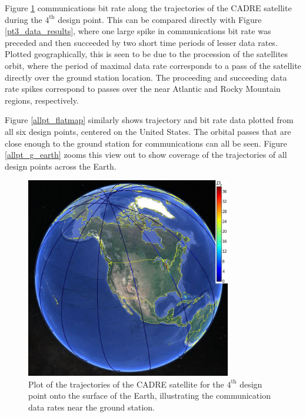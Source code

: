\documentclass[]{aiaa-tc} %
\begin{document}
    Figure \ref{pt3_g_earth} communications bit rate along the trajectories of the
    CADRE satellite during the $4^{\textrm{th}}$ design point. This can be compared
    directly with Figure \ref{pt3_data_results}, where one large spike in communications
    bit rate was preceded and then succeeded by two short time periods of lesser
    data rates. Plotted geographically, this is seen to be due to the procession of
    the satellites orbit, where the period of maximal data rate corresponds to a
    pass of the satellite directly over the ground station location. The proceeding and
    succeeding data rate spikes correspond to passes over the near Atlantic and
    Rocky Mountain regions, respectively.


    Figure \ref{allpt_flatmap} similarly shows trajectory and bit rate data plotted
    from all six design points, centered on the United States. The orbital passes
    that are close enough to the ground station for communications can all be seen.
    Figure \ref{allpt_g_earth} zooms this view out to show coverage of the trajectories
    of all design points across the Earth.


    \begin{figure}
    \centering
    \includegraphics[width=0.8\textwidth]{images/pt3_gearth3.png}
    \caption[width=0.4\textwidth]{Plot of the trajectories of the CADRE satellite
    for the $4^{\textrm{th}}$ design point onto the surface of the Earth, illustrating the
    communication data rates near the ground station.}
    \label{pt3_g_earth}
    \end{figure}
\end{document}

